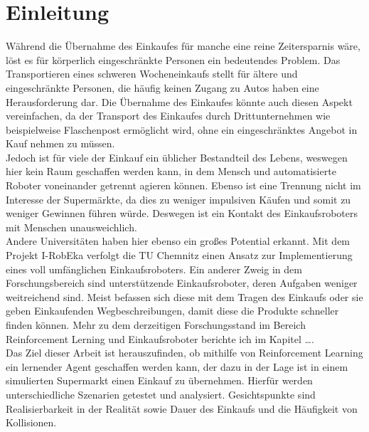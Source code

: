 \newpage
\section{Einleitung}
\label{einleitung}
Während die Übernahme des Einkaufes für manche eine reine Zeitersparnis wäre, löst es für körperlich eingeschränkte Personen ein bedeutendes Problem. Das Transportieren eines schweren Wocheneinkaufs stellt für ältere und eingeschränkte Personen, die häufig keinen Zugang zu Autos haben eine Herausforderung dar. Die Übernahme des Einkaufes könnte auch diesen Aspekt vereinfachen, da der Transport des Einkaufes durch Drittunternehmen wie beispielweise Flaschenpost ermöglicht wird, ohne ein eingeschränktes Angebot in Kauf nehmen zu müssen.
\\
Jedoch ist für viele der Einkauf ein üblicher Bestandteil des Lebens, weswegen hier kein Raum geschaffen werden kann, in dem Mensch und automatisierte Roboter voneinander getrennt agieren können. Ebenso ist eine Trennung nicht im Interesse der Supermärkte, da dies zu weniger impulsiven Käufen und somit zu weniger Gewinnen führen würde. Deswegen ist ein Kontakt des Einkaufsroboters mit Menschen unausweichlich. 
\\
Andere Universitäten haben hier ebenso ein großes Potential erkannt. Mit dem Projekt I-RobEka verfolgt die TU Chemnitz einen Ansatz zur Implementierung eines voll umfänglichen Einkaufsroboters. Ein anderer Zweig in dem Forschungsbereich sind unterstützende Einkaufsroboter, deren Aufgaben weniger weitreichend sind. Meist befassen sich diese mit dem Tragen des Einkaufs oder sie geben Einkaufenden Wegbeschreibungen, damit diese die Produkte schneller finden können. Mehr zu dem derzeitigen Forschungsstand im Bereich Reinforcement Lerning und Einkaufsroboter berichte ich im Kapitel …. 
\\
Das Ziel dieser Arbeit ist herauszufinden, ob mithilfe von Reinforcement Learning ein lernender Agent geschaffen werden kann, der dazu in der Lage ist in einem simulierten Supermarkt einen Einkauf zu übernehmen. Hierfür werden unterschiedliche Szenarien getestet und analysiert. Gesichtspunkte sind Realisierbarkeit in der Realität sowie Dauer des Einkaufs und die Häufigkeit von Kollisionen. 
\\

